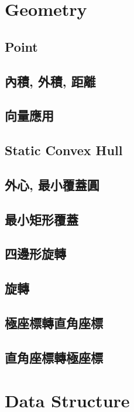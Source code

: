 \section{Geometry}
\subsection{Point} 

\subsection{內積, 外積, 距離} 

\subsection{向量應用} 

\subsection{Static Convex Hull} 

\subsection{外心, 最小覆蓋圓} 

\subsection{最小矩形覆蓋}

\subsection{四邊形旋轉} 

\subsection{旋轉} 

\subsection{極座標轉直角座標}

\subsection{直角座標轉極座標}


\section{Data Structure}
